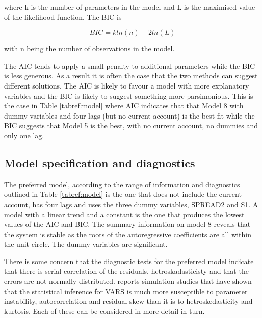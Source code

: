 \documentclass[12pt, a4paper, oneside]{article}\usepackage[]{graphicx}\usepackage[]{color}
\begin{document}
where k is the number of parameters in the model and L is the maximised value of the likelihood function.  The BIC is 

\begin{equation}
BIC= kln(n) - 2ln(L)
\end{equation}

with n being the number of observations in the model.

The AIC tends to apply a small penalty to additional parameters while the BIC is less generous.  As a result it is often the case that the two methods can suggest different solutions.  The AIC is likely to favour a model with more explanatory variables and the BIC is likely to suggest something more parsimonious.  This is the case in Table \ref{tabref:model} where AIC indicates that that Model 8 with dummy variables and four lags (but no current account) is the best fit while the BIC suggests that Model 5 is the best, with no current account, no dummies and only one lag. 

\subsection{Model specification and diagnostics}\label{secref:ass} 
The preferred model, according to the range of information and diagnostics outlined in Table \ref{tabref:model} is the one that does not include the current account, has four lags and uses the three dummy variables, SPREAD2 and S1.  A model with a linear trend and a constant is the one that produces the lowest values of the AIC and BIC.  The summary information on model 8 reveals that the system is stable as the roots of the autoregressive coefficients are all within the unit circle.  The dummy variables are significant. 
  
There is some concern that the diagnostic tests for the preferred model indicate that there is serial correlation of the residuals, hetroskadasticisty and that the errors are not normally distributed.  \citep[p.47]{Juselius2007Cointegrated} reports simulation studies that have shown that the statistical inference for VARS is much more susceptible to parameter instability, autocorrelation and residual skew than it is to hetroskedasticity and kurtosis.   Each of these can be considered in more detail in turn.
\end{document}
